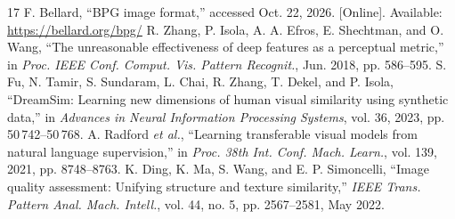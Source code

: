 \begin{thebibliography}{17}
 F. Bellard, ``BPG image format,'' accessed Oct. 22, 2026. [Online]. Available: \url{https://bellard.org/bpg/}
 R. Zhang, P. Isola, A. A. Efros, E. Shechtman, and O. Wang, ``The unreasonable effectiveness of deep features as a perceptual metric,'' in \emph{Proc. IEEE Conf. Comput. Vis. Pattern Recognit.}, Jun. 2018, pp. 586--595.
 S. Fu, N. Tamir, S. Sundaram, L. Chai, R. Zhang, T. Dekel, and P. Isola, ``DreamSim: Learning new dimensions of human visual similarity using synthetic data,'' in \emph{Advances in Neural Information Processing Systems}, vol. 36, 2023, pp. 50\,742--50\,768.
 A. Radford \emph{et al.}, ``Learning transferable visual models from natural language supervision,'' in \emph{Proc. 38th Int. Conf. Mach. Learn.}, vol. 139, 2021, pp. 8748--8763.
 K. Ding, K. Ma, S. Wang, and E. P. Simoncelli, ``Image quality assessment: Unifying structure and texture similarity,'' \emph{IEEE Trans. Pattern Anal. Mach. Intell.}, vol. 44, no. 5, pp. 2567--2581, May 2022.
\end{thebibliography}
